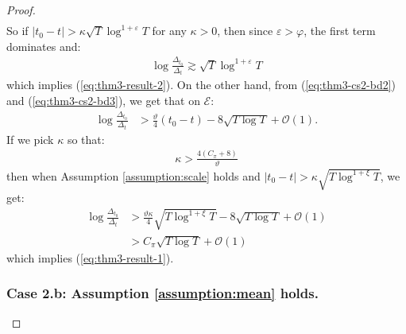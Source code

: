 \begin{proof}
\begin{align*}
\end{align*}
So if $|t_0 -t| > \kappa \sqrt{T}\log^{1+\varepsilon}T$ for any $\kappa > 0$, then since $\varepsilon > \varphi$, the first term dominates and:
\begin{align*}
    \log \frac{\Delta_{t_0}}{\Delta_t} \gtrsim \sqrt{T}\log^{1+\varepsilon}T
\end{align*}
which implies (\ref{eq:thm3-result-2}). On the other hand, from (\ref{eq:thm3-cs2-bd2}) and (\ref{eq:thm3-cs2-bd3}), we get that on $\mathcal{E}$:
\begin{align*}
    \log \frac{\Delta_{t_0}}{\Delta_t} &> \frac{\vartheta}{4}(t_0-t) - 8\sqrt{T \log T} + \mathcal{O}(1).
\end{align*}
If we pick $\kappa$ so that: 
\begin{align*}
    \kappa > \frac{4(C_\pi + 8)}{\vartheta}
\end{align*}
then when Assumption \ref{assumption:scale} holds and $|t_0 - t| > \kappa \sqrt{T\log^{1+\xi} T}$, we get:
\begin{align*}
    \log \frac{\Delta_{t_0}}{\Delta_t} &> \frac{\vartheta\kappa}{4}\sqrt{T\log^{1+\xi} T}  -  8\sqrt{T \log T} + \mathcal{O}(1)\\
    &> C_\pi \sqrt{T \log T} + \mathcal{O}(1) \tag{$\xi \geq 0$}
\end{align*}
which implies (\ref{eq:thm3-result-1}). 

\subsubsection*{Case 2.b: Assumption \ref{assumption:mean} holds.}


\end{proof}
